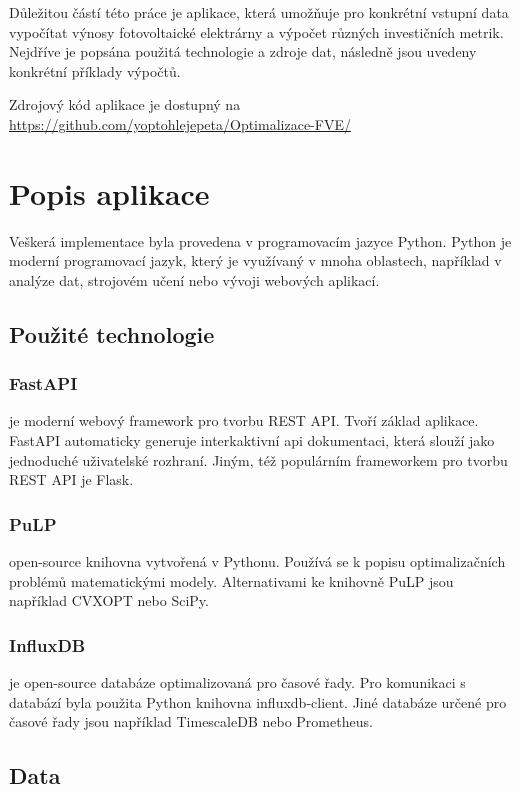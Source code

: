Důležitou částí této práce je aplikace, která umožňuje pro konkrétní vstupní data vypočítat výnosy fotovoltaické elektrárny a výpočet různých investičních metrik.
Nejdříve je popsána použitá technologie a zdroje dat, následně jsou uvedeny konkrétní příklady výpočtů.

Zdrojový kód aplikace je dostupný na \newline \url{https://github.com/yoptohlejepeta/Optimalizace-FVE/}

\section{Popis aplikace}

Veškerá implementace byla provedena v programovacím jazyce Python. Python je moderní programovací jazyk, který je využívaný v mnoha oblastech, například v analýze dat, strojovém učení nebo vývoji webových aplikací.



\subsection{Použité technologie}

\subsubsection{FastAPI} je moderní webový framework pro tvorbu REST API.
Tvoří základ aplikace.
FastAPI automaticky generuje interkaktivní api dokumentaci, která slouží jako jednoduché uživatelské rozhraní.
Jiným, též populárním frameworkem pro tvorbu REST API je Flask.

\subsubsection{PuLP} open-source knihovna vytvořená v Pythonu.
Používá se k popisu optimalizačních problémů matematickými modely.
Alternativami ke knihovně PuLP jsou například CVXOPT nebo SciPy.

\subsubsection{InfluxDB} je open-source databáze optimalizovaná pro časové řady.
Pro komunikaci s databází byla použita Python knihovna influxdb-client.
Jiné databáze určené pro časové řady jsou například TimescaleDB nebo Prometheus.

\subsection{Data}

